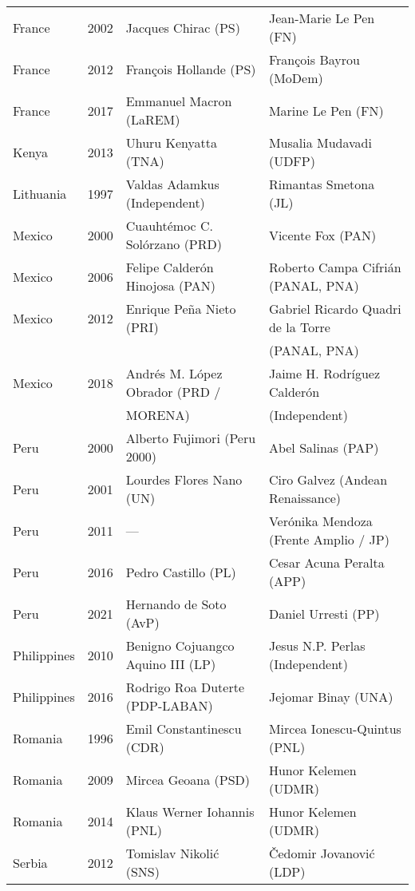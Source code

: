 {\begin{longtable}{|l|c|l|l|}
France & 2002 & Jacques Chirac (PS) & Jean-Marie Le Pen (FN)\\ 
France & 2012 &   Fran\c{c}ois Hollande (PS)   &   Fran\c{c}ois Bayrou (MoDem)  \\ 
France & 2017 &   Emmanuel Macron (LaREM)    &   Marine Le Pen (FN) \\ 
Kenya     & 2013 &   Uhuru Kenyatta (TNA)    &  Musalia Mudavadi (UDFP)    \\ 
Lithuania & 1997 & Valdas Adamkus (Independent)      & Rimantas Smetona (JL)    \\ 
Mexico     & 2000 & Cuauht\'{e}moc C. Sol\'{o}rzano  (PRD)  & Vicente Fox (PAN)     \\ 
 Mexico     & 2006 &  Felipe Calder\'on Hinojosa (PAN)   &  Roberto Campa Cifri\'an (PANAL, PNA) \\ 
 Mexico     & 2012 &   Enrique Pe\~na Nieto (PRI) & Gabriel Ricardo Quadri de la Torre   \\ 
             &  &    &   (PANAL, PNA) \\ 
 Mexico     & 2018 & Andr\'es M. L\'opez Obrador (PRD /   &  Jaime H. Rodr\'iguez Calder\'on   \\ 
      &   &  MORENA) &    (Independent)  \\ 
 Peru     & 2000 & Alberto Fujimori (Peru 2000) & Abel Salinas (PAP)           \\ 
 Peru     & 2001 & Lourdes Flores Nano (UN)    &   Ciro Galvez (Andean Renaissance)      \\ 
 Peru     & 2011 &  --- &  Ver\'onika Mendoza (Frente Amplio / JP)    \\ 
 Peru     & 2016 & Pedro Castillo (PL) &   Cesar Acuna Peralta (APP)  \\ 
 Peru     & 2021 & Hernando de Soto (AvP) &   Daniel Urresti (PP)  \\ 
 Philippines     & 2010 &  Benigno Cojuangco Aquino III (LP)  &  Jesus N.P. Perlas (Independent) \\ 
 Philippines     & 2016 & Rodrigo Roa Duterte (PDP-LABAN)           &  Jejomar Binay (UNA)     \\ 
 Romania     & 1996 & Emil Constantinescu (CDR) & Mircea Ionescu-Quintus (PNL)             \\ 
 Romania & 2009 & Mircea Geoana (PSD) &   Hunor Kelemen (UDMR)  \\ 
 Romania & 2014 &   Klaus Werner Iohannis (PNL)    &   Hunor Kelemen (UDMR)    \\ 
 Serbia     & 2012 &   Tomislav Nikoli\'c (SNS)         &  \v{C}edomir Jovanovi\'c (LDP)     \\ 

\end{longtable}}

